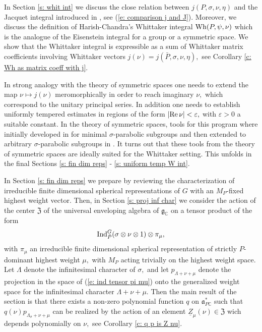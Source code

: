 \documentclass[12pt,a4paper]{article}
\def\msy#1{{\mathbb #1}}
\def\C{{\msy C}}
\def\ge{\varepsilon}
\def\gs{\sigma}
\def\got#1{\mathfrak #1}
\def\fa{{\got a}}
\def\fg{{\got g}}
\def\Re{{\rm Re}\,}
\def\iC{{\scriptscriptstyle \C}}
\numberwithin{Thm}{section}
\numberwithin{equation}{section}
\def\Ind{{\rm Ind}}
\def\fZ{{\mathfrak Z}}
\def\Wh{{\rm Wh}}
\def\faPdc{{\fa_{P\iC}^*}}
\def\gL{\Lambda}
\numberwithin{equation}{section}
\def\fZ{{\mathfrak Z}}
\def\gL{\Lambda}
\def\faPdc{\fa_{P\iC}^*}
\begin{document}
In Section \ref{s: whit int} we discuss the close relation between $j(P, \gs, \nu,\eta)$ 
and the Jacquet integral introduced in
 \cite{Wrrg2}, see (\ref{e: comparison j and J}). Moreover,
we discuss the definition of Harish-Chandra's
Whittaker integral $\Wh(P,\psi, \nu)$ which is the analogue of the Eisenstein integral for a group or a symmetric space.  We show that the Whittaker integral  is expressible as a sum of Whittaker matrix coefficients involving Whittaker vectors $j(\nu) = j(\bar P, \gs, \nu, \eta),$ see
Corollary \ref{c: Wh as matrix coeff with j}.
 
In strong analogy with the theory of symmetric spaces one needs to extend the map $\nu \mapsto j(\nu)$ 
meromorphically in order to reach imaginary $\nu,$ which correspond to the unitary principal series. 
In addition one needs to establish uniformly tempered estimates in regions of the form 
$|\Re \nu|< \ge,$ with $\ge > 0$ a suitable constant. In the theory of symmetric spaces, 
tools for this program where initially developed in \cite{Bps2} for minimal $\gs$-parabolic subgroups 
and then extended to arbitrary $\gs$-parabolic subgroups in \cite{CD}.
It turns out that these tools from the theory of symmetric spaces are ideally suited for the Whittaker setting.
This unfolds in the final Sections \ref{s: fin dim reps} - \ref{s: uniform temp W int}.

In Section \ref{s: fin dim reps} we prepare  by reviewing the characterization
of irreducible finite dimensional spherical representations of $G$ with an $M_P$-fixed highest weight vector.
Then, in Section \ref{s: proj inf char} we consider the action of the center $\fZ$ of the universal enveloping 
algebra of $\fg_\iC$ on a tensor product of the form 
\begin{equation}
\label{e: ind tensor pi mu}
\Ind_{\bar P}^G(\gs\otimes \nu \otimes 1)\otimes \pi_\mu,
\end{equation} 
with $\pi_\mu$ 
an irreducible finite dimensional spherical representation of strictly $P$-dominant 
highest weight $\mu,$ with 
$M_P$ acting trivially on the highest weight space.
Let $\gL$ denote 
the infinitesimal character of $\gs,$ and let 
$p_{\gL + \nu +\mu}$ denote the projection in the space of (\ref{e: ind tensor pi mu}) onto the generalized weight space
for the infinitesimal character $\gL + \nu + \mu.$ 
 Then the main result of the section is that there exists a non-zero polynomial function $q$ on $\faPdc$ 
 such that 
$q(\nu) p_{\gL_\gs + \nu + \mu}$ can  be realized by the action of an element $\underline Z_\mu(\nu) \in \fZ$ wich depends polynomially on $\nu,$ see Corollary \ref{c: q p is Z nu}.
\end{document}
